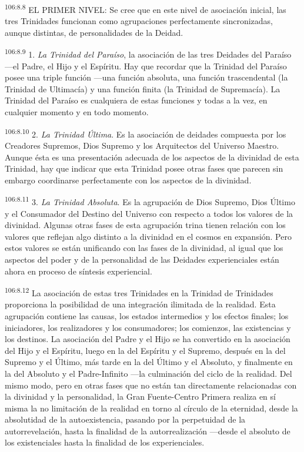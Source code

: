 \par
\textsuperscript{106:8.8} EL PRIMER NIVEL: Se cree que en este nivel de asociación inicial, las tres Trinidades funcionan como agrupaciones perfectamente sincronizadas, aunque distintas, de personalidades de la Deidad.

\par
\textsuperscript{106:8.9} 1. \textit{La Trinidad del Paraíso}, la asociación de las tres Deidades del Paraíso ---el Padre, el Hijo y el Espíritu. Hay que recordar que la Trinidad del Paraíso posee una triple función ---una función absoluta, una función trascendental (la Trinidad de Ultimacía) y una función finita (la Trinidad de Supremacía). La Trinidad del Paraíso es cualquiera de estas funciones y todas a la vez, en cualquier momento y en todo momento.

\par
\textsuperscript{106:8.10} 2. \textit{La Trinidad Última}. Es la asociación de deidades compuesta por los Creadores Supremos, Dios Supremo y los Arquitectos del Universo Maestro. Aunque ésta es una presentación adecuada de los aspectos de la divinidad de esta Trinidad, hay que indicar que esta Trinidad posee otras fases que parecen sin embargo coordinarse perfectamente con los aspectos de la divinidad.

\par
\textsuperscript{106:8.11} 3. \textit{La Trinidad Absoluta}. Es la agrupación de Dios Supremo, Dios Último y el Consumador del Destino del Universo con respecto a todos los valores de la divinidad. Algunas otras fases de esta agrupación trina tienen relación con los valores que reflejan algo distinto a la divinidad en el cosmos en expansión. Pero estos valores se están unificando con las fases de la divinidad, al igual que los aspectos del poder y de la personalidad de las Deidades experienciales están ahora en proceso de síntesis experiencial.

\par
\textsuperscript{106:8.12} La asociación de estas tres Trinidades en la Trinidad de Trinidades proporciona la posibilidad de una integración ilimitada de la realidad. Esta agrupación contiene las causas, los estados intermedios y los efectos finales; los iniciadores, los realizadores y los consumadores; los comienzos, las existencias y los destinos. La asociación del Padre y el Hijo se ha convertido en la asociación del Hijo y el Espíritu, luego en la del Espíritu y el Supremo, después en la del Supremo y el Último, más tarde en la del Último y el Absoluto, y finalmente en la del Absoluto y el Padre-Infinito ---la culminación del ciclo de la realidad. Del mismo modo, pero en otras fases que no están tan directamente relacionadas con la divinidad y la personalidad, la Gran Fuente-Centro Primera realiza en sí misma la no limitación de la realidad en torno al círculo de la eternidad, desde la absolutidad de la autoexistencia, pasando por la perpetuidad de la autorrevelación, hasta la finalidad de la autorrealización ---desde el absoluto de los existenciales hasta la finalidad de los experienciales.

